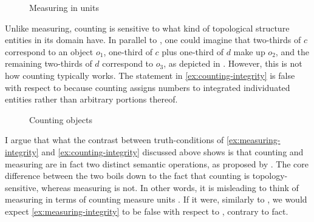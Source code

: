 \vfill
\begin{figure}[H]
	\centering
	\caption{Measuring in units}
	\label{fig:measuring-in-units}
\end{figure}
\vfill\pagebreak

Unlike measuring, counting is sensitive to what kind of topological structure entities in its domain have. In parallel to , one could imagine that two-thirds of $c$ correspond to an object $o_1$, one-third of $c$ plus one-third of $d$ make up $o_2$, and the remaining two-thirds of $d$ correspond to $o_3$, as depicted in . However, this is not how counting typically works. The statement in \ref{ex:counting-integrity} is false with respect to  because counting assigns numbers to integrated individuated entities rather than arbitrary portions thereof.

\begin{figure}[h!]
	\centering
	\caption{Counting objects}
	\label{fig:counting-objects}
\end{figure}

I argue that what the contrast between truth-conditions of \ref{ex:measuring-integrity} and \ref{ex:counting-integrity} discussed above shows is that counting and measuring are in fact two distinct semantic operations, as proposed by \citet{rothstein2017semantics}. The core difference between the two boils down to the fact that counting is topology-sensitive, whereas measuring is not. In other words, it is misleading to think of measuring in terms of counting measure units \citep[pace][]{gil2013numeral}. If it were, similarly to , we would expect \ref{ex:measuring-integrity} to be false with respect to , contrary to fact. 

